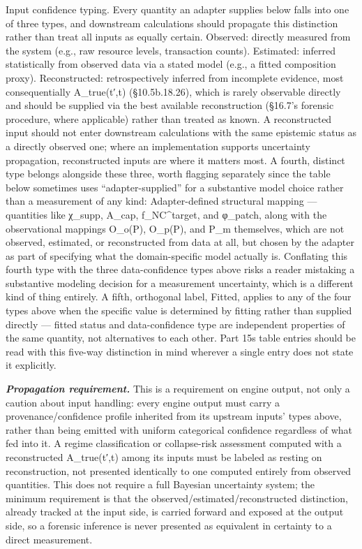 \documentclass[
]{article}
\begin{document}
Input confidence typing. Every quantity an adapter supplies below falls
into one of three types, and downstream calculations should propagate
this distinction rather than treat all inputs as equally certain.
Observed: directly measured from the system (e.g., raw resource levels,
transaction counts). Estimated: inferred statistically from observed
data via a stated model (e.g., a fitted composition proxy).
Reconstructed: retrospectively inferred from incomplete evidence, most
consequentially A\_true(t′,t) (§10.5b.18.26), which is rarely observable
directly and should be supplied via the best available reconstruction
(§16.7's forensic procedure, where applicable) rather than treated as
known. A reconstructed input should not enter downstream calculations
with the same epistemic status as a directly observed one; where an
implementation supports uncertainty propagation, reconstructed inputs
are where it matters most. A fourth, distinct type belongs alongside
these three, worth flagging separately since the table below sometimes
uses ``adapter-supplied'' for a substantive model choice rather than a
measurement of any kind: Adapter-defined structural mapping ---
quantities like χ\_supp, A\_cap, f\_NC\^{}target, and φ\_patch, along
with the observational mappings O\_o(P), O\_p(P), and P\_m themselves,
which are not observed, estimated, or reconstructed from data at all,
but chosen by the adapter as part of specifying what the domain-specific
model actually is. Conflating this fourth type with the three
data-confidence types above risks a reader mistaking a substantive
modeling decision for a measurement uncertainty, which is a different
kind of thing entirely. A fifth, orthogonal label, Fitted, applies to
any of the four types above when the specific value is determined by
fitting rather than supplied directly --- fitted status and
data-confidence type are independent properties of the same quantity,
not alternatives to each other. Part 15\textquotesingle s table entries
should be read with this five-way distinction in mind wherever a single
entry does not state it explicitly.

\emph{\textbf{Propagation requirement.}} This is a requirement on engine
output, not only a caution about input handling: every engine output
must carry a provenance/confidence profile inherited from its upstream
inputs' types above, rather than being emitted with uniform categorical
confidence regardless of what fed into it. A regime classification or
collapse-risk assessment computed with a reconstructed A\_true(t′,t)
among its inputs must be labeled as resting on reconstruction, not
presented identically to one computed entirely from observed quantities.
This does not require a full Bayesian uncertainty system; the minimum
requirement is that the observed/estimated/reconstructed distinction,
already tracked at the input side, is carried forward and exposed at the
output side, so a forensic inference is never presented as equivalent in
certainty to a direct measurement.
\end{document}
